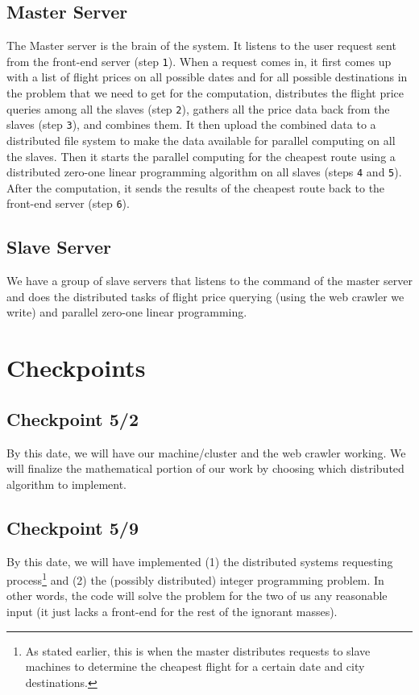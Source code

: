 \documentclass{article}
\begin{document}
\subsection{Master Server}
The Master server is the brain of the system. It listens to the user request sent from the front-end server (step \texttt{1}). When a request comes
in, it first comes up with a list of flight prices on all possible dates and for all possible destinations in the problem that we need to get for the
computation, distributes the flight price queries among all the slaves (step \texttt{2}), gathers all the price data back from the slaves (step
\texttt{3}), and combines them. It then upload the combined data to a distributed file system to make the data available for parallel computing on all
the slaves. Then it starts the parallel computing for the cheapest route using a distributed zero-one linear programming algorithm on all slaves
(steps \texttt{4} and \texttt{5}). After the computation, it sends the results of the cheapest route back to the front-end server (step \texttt{6}).

\subsection{Slave Server}
We have a group of slave servers that listens to the command of the master server and does the distributed tasks of flight price querying (using the
web crawler we write) and parallel zero-one linear programming.

\section{Checkpoints}

\subsection{Checkpoint 5/2}\label{sec:checkpoint1}

By this date, we will have our machine/cluster and the web crawler working. We will finalize the mathematical portion of our work by choosing which
distributed algorithm to implement.

\subsection{Checkpoint 5/9}\label{sec:checkpoint2}

By this date, we will have implemented (1) the distributed systems requesting process\footnote{As stated earlier, this is when the master distributes
requests to slave machines to determine the cheapest flight for a certain date and city destinations.} and (2) the (possibly distributed) integer
programming problem.  In other words, the code will solve the problem for the two of us any reasonable input (it just lacks a front-end for the rest
of the ignorant masses). \\
\end{document}
